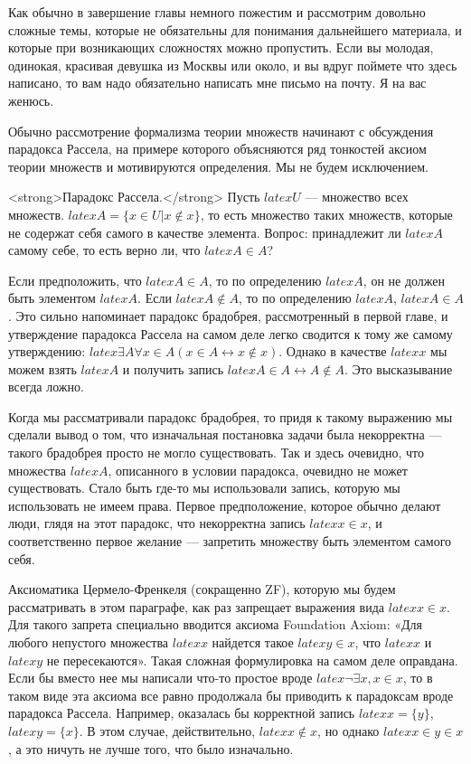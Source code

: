 Как обычно в завершение главы немного пожестим и рассмотрим довольно сложные темы, которые не обязательны для понимания дальнейшего материала, и которые при возникающих сложностях можно пропустить. Если вы молодая, одинокая, красивая девушка из Москвы или около, и вы вдруг поймете что здесь написано, то вам надо обязательно написать мне письмо на почту. Я на вас женюсь.

Обычно рассмотрение формализма теории множеств начинают с обсуждения парадокса Рассела, на примере которого объясняются ряд тонкостей аксиом теории множеств и мотивируются определения. Мы не будем исключением.

<strong>Парадокс Рассела.</strong> Пусть $latex U$ — множество всех множеств. $latex A = \{x\in U|x\not\in x\}$, то есть множество таких множеств, которые не содержат себя самого в качестве элемента. Вопрос: принадлежит ли $latex A$ самому себе, то есть верно ли, что $latex A\in A$?

Если предположить, что $latex A\in A$, то по определению $latex A$, он не должен быть элементом $latex A$. Если $latex A\not\in A$, то по определению $latex A$, $latex A \in A$. Это сильно напоминает парадокс брадобрея, рассмотренный в первой главе, и утверждение парадокса Рассела на самом деле легко сводится к тому же самому утверждению: $latex \exists A\forall x\in A (x\in A \leftrightarrow x\not\in x)$. Однако в качестве $latex x$ мы можем взять $latex A$ и получить запись $latex A\in A \leftrightarrow A\not\in A$. Это высказывание всегда ложно.

Когда мы рассматривали парадокс брадобрея, то придя к такому выражению мы сделали вывод о том, что изначальная постановка задачи была некорректна — такого брадобрея просто не могло существовать. Так и здесь очевидно, что множества $latex A$, описанного в условии парадокса, очевидно не может существовать. Стало быть где-то мы использовали запись, которую мы использовать не имеем права. Первое предположение, которое обычно делают люди, глядя на этот парадокс, что некорректна запись $latex x\in x$, и соответственно первое желание — запретить множеству быть элементом самого себя.

Аксиоматика Цермело-Френкеля (сокращенно ZF), которую мы будем рассматривать в этом параграфе, как раз запрещает выражения вида $latex x\in x$. Для такого запрета специально вводится аксиома Foundation Axiom: «Для любого непустого множества $latex x$ найдется такое $latex y\in x$, что $latex x$ и $latex y$ не пересекаются». Такая сложная формулировка на самом деле оправдана. Если бы вместо нее мы написали что-то простое вроде $latex \neg \exists x, x\in x$, то в таком виде эта аксиома все равно продолжала бы приводить к парадоксам вроде парадокса Рассела. Например, оказалась бы корректной запись $latex x=\{y\}$, $latex y=\{x\}$. В этом случае, действительно, $latex x\not\in x$, но однако $latex x\in y\in x$, а это ничуть не лучше того, что было изначально.

